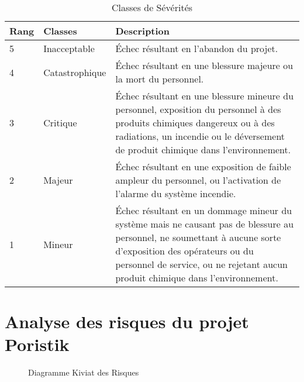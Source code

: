 \documentclass[12pt]{article}
\begin{document}
 
\begin{table}[H]
\centering
\begin{tabular}{ p{2cm} p{3cm} p{8cm}}
\hline \bf Rang & \bf Classes & \bf Description \\

\hline 5 & Inacceptable & Échec résultant en l’abandon du projet.\\
4 & Catastrophique & Échec résultant en une blessure majeure ou la mort du personnel. \\
3 & Critique & Échec résultant en une blessure mineure du personnel, exposition du personnel à des produits chimiques dangereux ou à des radiations, un incendie ou le déversement de produit chimique dans l’environnement. \\
2 & Majeur & Échec résultant en une exposition de faible ampleur du personnel, ou l’activation de l’alarme du système incendie.\\
1 & Mineur & Échec résultant en un dommage mineur du système mais ne causant pas de blessure au personnel, ne soumettant à aucune sorte d’exposition des opérateurs ou du personnel de service, ou ne rejetant aucun produit chimique dans l’environnement. \\
\hline
\end{tabular}
\caption{Classes de Sévérités}
\end{table}

\section{Analyse des risques du projet Poristik}
\newpage
\begin{figure}
\caption{Diagramme Kiviat des Risques}
\end{figure}
\end{document}
